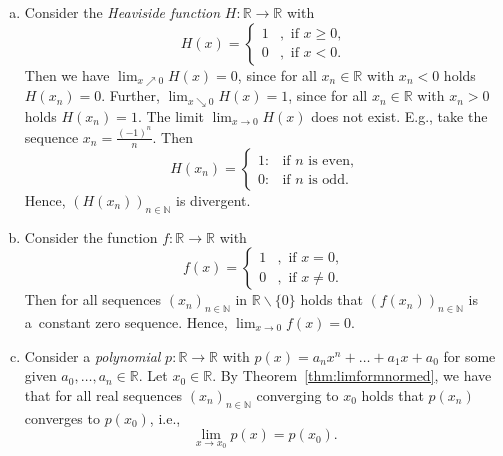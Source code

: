 \begin{example}\label{ex:funclim}
\begin{enumerate}[a)]
 \item Consider the {\em Heaviside function} $H:\mathbb{R}\to\mathbb{R}$ with
\[H(x)=\begin{cases}1&,\text{ if }x\geq 0,\\0&,\text{ if }x<0.\end{cases}\]
Then we have $\lim_{x\nearrow 0}H(x)=0$, since for all $x_n\in\mathbb{R}$ with $x_n<0$ holds $H(x_n)=0$.
Further, $\lim_{x\searrow 0}H(x)=1$, since for all $x_n\in\mathbb{R}$ with $x_n>0$ holds $H(x_n)=1$. The limit $\lim_{x\to 0}H(x)$ does not exist. E.g., take the sequence $x_n=\frac{(-1)^n}n$. Then
\[H(x_n)=\begin{cases}1:&\text{if $n$ is even,}\\0:&\text{if $n$ is odd.}\end{cases}\]
Hence, $(H(x_n))_{n\in\mathbb{N}}$ is divergent.

\item Consider the function $f:\mathbb{R}\to\mathbb{R}$ with
\[f(x)=\begin{cases}1&,\text{ if }x= 0,\\0&,\text{ if }x\neq0.\end{cases}\]
Then for all sequences $(x_n)_{n\in\mathbb{N}}$ in $\mathbb{R}\backslash\{0\}$ holds that $(f(x_n))_{n\in\mathbb{N}}$ is a~constant zero sequence. Hence, $\lim_{x\to 0}f(x)=0$.

 \item Consider a {\em polynomial} $p:\mathbb{R}\to\mathbb{R}$ with $p(x)=a_nx^n+\ldots+a_1x+a_0$ for some given $a_0,\ldots,a_n\in\mathbb{R}$. Let $x_0\in\mathbb{R}$.  
By Theorem~\ref{thm:limformnormed}, we have that for
all real sequences $(x_n)_{n\in\mathbb{N}}$ converging to $x_0$ holds that $p(x_n)$ converges to $p(x_0)$, i.e.,
\[\lim_{x\to x_0}p(x)=p(x_0).\]
\end{enumerate}
\end{example}

